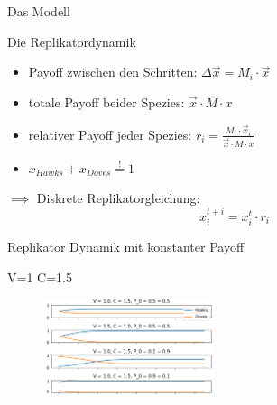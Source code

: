 \documentclass{beamer}
\begin{document}
\begin{frame}{Das Modell}

  \begin{block}{Die Replikatordynamik}
    \begin{itemize}
       \item Payoff zwischen den Schritten: $\Delta \vec{x} = M_{i} \cdot \vec{x}$
       \item totale Payoff beider Spezies: $\vec{x} \cdot M \cdot {x}$
       \item relativer Payoff jeder Spezies: $r_{i} = \frac{M_{i} \cdot \vec{x}_{i}}{\vec{x} \cdot M \cdot {x}}$ 
       \item $x_{Hawks} +x_{Doves} \overset{!}{=} 1$
       
       
    \end{itemize}
    $\implies$ Diskrete Replikatorgleichung: \begin{equation} x_{i}^{t+i} = x_{i}^{t} \cdot r_{i} \end{equation}
 \end{block}
\end{frame}










\begin{frame}{Replikator Dynamik mit konstanter Payoff}
    \begin{block}{V=1 C=1.5}


      
        \begin{figure}[htp]
            \centering
            \includegraphics[width=5cm]{Figs/Konstant.png}
            \label{fig:}
        \end{figure}

    \end{block} 
    
\end{frame}

\end{document}
